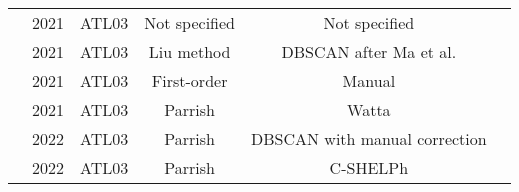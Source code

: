 \begin{table}
\begin{tabular}{rccccc}
            \citeauthor{Lee2021}               & 2021 & ATL03   & Not specified                 & Not specified                 \\ 
            \citeauthor{Liu2021}               & 2021 & ATL03   & Liu method                    & DBSCAN after Ma et al.        \\ 
            \citeauthor{Coveney2021a}          & 2021 & ATL03   & First-order                   & Manual                        \\ 
            \citeauthor{Datta2021}             & 2021 & ATL03   & Parrish                       & Watta                         \\ 
            \citeauthor{LeQuilleuc2022b}       & 2022 & ATL03   & Parrish                       & DBSCAN with manual correction \\ 
            \citeauthor{Thomas2022}            & 2022 & ATL03   & Parrish                       & C-SHELPh                      \\
            \bottomrule
      \end{tabular}
\end{table}

